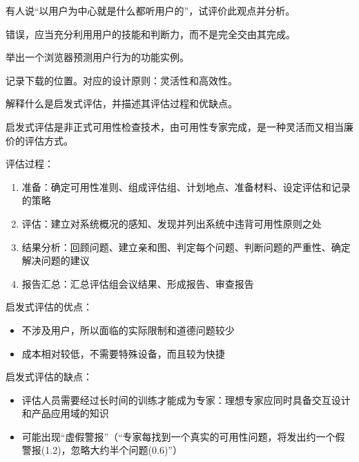 \begin{problem}[2015]
有人说“以用户为中心就是什么都听用户的”，试评价此观点并分析。
\end{problem}

\begin{solution}
错误，应当充分利用用户的技能和判断力，而不是完全交由其完成。
\end{solution}



\begin{problem}[2016]
举出一个浏览器预测用户行为的功能实例。
\end{problem}

\begin{solution}
记录下载的位置。对应的设计原则：灵活性和高效性。
\end{solution}



\begin{problem}[2015]
解释什么是启发式评估，并描述其评估过程和优缺点。
\end{problem}

\begin{solution}
启发式评估是非正式可用性检查技术，由可用性专家完成，是一种灵活而又相当廉价的评估方式。

评估过程：
\begin{enumerate}[label=\arabic*.]
    \item 准备：确定可用性准则、组成评估组、计划地点、准备材料、设定评估和记录的策略
    \item 评估：建立对系统概况的感知、发现并列出系统中违背可用性原则之处
    \item 结果分析：回顾问题、建立亲和图、判定每个问题、判断问题的严重性、确定解决问题的建议
    \item 报告汇总：汇总评估组会议结果、形成报告、审查报告
\end{enumerate}

启发式评估的优点：
\begin{itemize}
    \item 不涉及用户，所以面临的实际限制和道德问题较少
    \item 成本相对较低，不需要特殊设备，而且较为快捷
\end{itemize}

启发式评估的缺点：
\begin{itemize}
    \item 评估人员需要经过长时间的训练才能成为专家：理想专家应同时具备交互设计和产品应用域的知识
    \item 可能出现“虚假警报”（“专家每找到一个真实的可用性问题，将发出约一个假警报(1.2)，忽略大约半个问题(0.6)”）
\end{itemize}
\end{solution}



